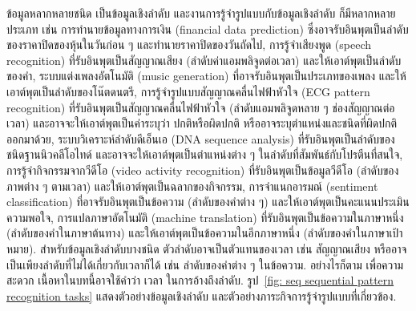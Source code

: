 ข้อมูลหลากหลายชนิด เป็นข้อมูลเชิงลำดับ
และงานการรู้จำรูปแบบกับข้อมูลเชิงลำดับ ก็มีหลากหลายประเภท
เช่น 
การทำนายข้อมูลทางการเงิน (financial data prediction) 
ซึ่งอาจรับอินพุตเป็นลำดับของราคาปิดของหุ้นในวันก่อน ๆ และทำนายราคาปิดของวันถัดไป,
การรู้จำเสียงพูด (speech recognition)
ที่รับอินพุตเป็นสัญญาณเสียง (ลำดับค่าแอมพลิจูดต่อเวลา) และให้เอาต์พุตเป็นลำดับของคำ,
%
ระบบแต่งเพลงอัตโนมัติ (music generation)
ที่อาจรับอินพุตเป็นประเภทของเพลง และให้เอาต์พุตเป็นลำดับของโน๊ตดนตรี,
การรู้จำรูปแบบสัญญาณคลื่นไฟฟ้าหัวใจ (ECG pattern recognition)
ที่รับอินพุตเป็นสัญญาณคลื่นไฟฟ้าหัวใจ (ลำดับแอมพลิจูดหลาย ๆ ช่องสัญญาณต่อเวลา) และอาจจะให้เอาต์พุตเป็นค่าระบุว่า 
ปกติหรือผิดปกติ หรืออาจระบุตำแหน่งและชนิดที่ผิดปกติออกมาด้วย,
ระบบวิเคราะห์ลำดับดีเอ็นเอ (DNA sequence analysis)
ที่รับอินพุตเป็นลำดับของชนิดฐานนิวคลีโอไทด์ และอาจจะให้เอาต์พุตเป็นตำแหน่งต่าง ๆ ในลำดับที่สัมพันธ์กับโปรตีนที่สนใจ,
การรู้จำกิจกรรมจากวีดีโอ (video activity recognition)
ที่รับอินพุตเป็นข้อมูลวีดีโอ (ลำดับของภาพต่าง ๆ ตามเวลา) และให้เอาต์พุตเป็นฉลากของกิจกรรม,
การจำแนกอารมณ์ (sentiment classification)
ที่อาจรับอินพุตเป็นข้อความ (ลำดับของคำต่าง ๆ) และให้เอาต์พุตเป็นคะแนนประเมินความพอใจ,
การแปลภาษาอัตโนมัติ (machine translation) 
ที่รับอินพุตเป็นข้อความในภาษาหนึ่ง (ลำดับของคำในภาษาต้นทาง) และให้เอาต์พุตเป็นข้อความในอีกภาษาหนึ่ง (ลำดับของคำในภาษาเป้าหมาย).
%
%
%
สำหรับข้อมูลเชิงลำดับบางชนิด ตัวลำดับอาจเป็นตัวแทนของเวลา เช่น สัญญาณเสียง
หรืออาจเป็นเพียงลำดับที่ไม่ได้เกี่ยวกับเวลาก็ได้ เช่น ลำดับของคำต่าง ๆ ในข้อความ.
อย่างไรก็ตาม เพื่อความสะดวก เนื้อหาในบทนี้อาจใช้คำว่า เวลา ในการอ้างถึงลำดับ.
รูป~\ref{fig: seq sequential pattern recognition tasks} แสดงตัวอย่างข้อมูลเชิงลำดับ และตัวอย่างภาระกิจการรู้จำรูปแบบที่เกี่ยวข้อง.

